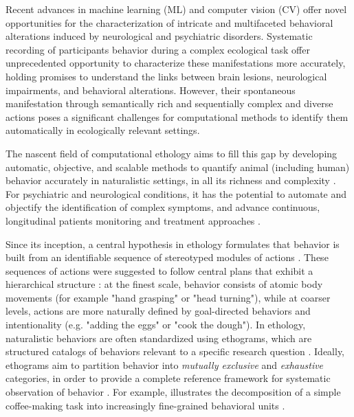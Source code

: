     Recent advances in machine learning (ML) and computer vision (CV) offer novel opportunities for the characterization of intricate and multifaceted behavioral alterations induced by neurological and psychiatric disorders. Systematic recording of participants behavior during a complex ecological task offer unprecedented opportunity to characterize these manifestations more accurately, holding promises to understand the links between brain lesions, neurological impairments, and behavioral alterations. However, their spontaneous manifestation through semantically rich and sequentially complex and diverse actions poses a significant challenges for computational methods to identify them automatically in ecologically relevant settings. 

    The nascent field of computational ethology aims to fill this gap by developing automatic, objective, and scalable methods to quantify animal (including human) behavior accurately in naturalistic settings, in all its richness and complexity \cite{Anderson2014, Wiltschko2015, Berman2014}. For psychiatric and neurological conditions, it has the potential to automate and objectify the identification of complex symptoms, and advance continuous, longitudinal patients monitoring and treatment approaches \cite{Bavaresco2022, Mobbs2021}. 

    Since its inception, a central hypothesis in ethology formulates that behavior is built from an identifiable sequence of stereotyped modules of actions \cite{tinbergen1951study}. These sequences of actions were suggested to follow central plans that exhibit a hierarchical structure \cite{BOTVINICK2008201, Rosenbaum2007, Barker1965, lashley1951serial}: at the finest scale, behavior consists of atomic body movements (for example "hand grasping" or "head turning"), while at coarser levels, actions are more naturally defined by goal-directed behaviors and intentionality (e.g. "adding the eggs" or "cook the dough"). In ethology, naturalistic behaviors are often standardized using ethograms, which are structured catalogs of behaviors relevant to a specific research question \cite{tinbergen1951study}. Ideally, ethograms aim to partition behavior into \textit{mutually exclusive} and \textit{exhaustive} categories, in order to provide a complete reference framework for systematic observation of behavior \cite{Jones2016Etho}. For example,  illustrates the decomposition of a simple coffee-making task into increasingly fine-grained behavioral units \cite{Cooper2000}.
    
